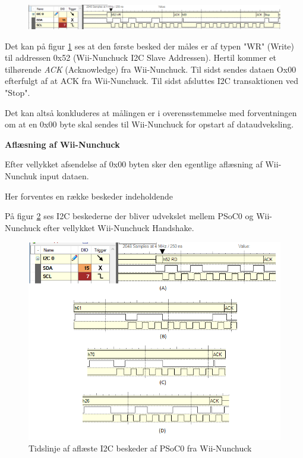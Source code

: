 \begin{figure}[H]
	\centering
	\includegraphics[width=\textwidth]{Test/images/writerequest}
	\caption{}
	\label{fig:NunchuckWriteValues}
\end{figure}

Det kan på figur \ref{fig:NunchuckWriteValues} ses at den første besked der måles er af typen "WR" (Write) til addressen 0x52 (Wii-Nunchuck I2C Slave Addressen). Hertil kommer et tilhørende \textit{ACK} (Acknowledge) fra Wii-Nunchuck. Til sidst sendes dataen Ox00 efterfulgt af at ACK fra Wii-Nunchuck. Til sidst afsluttes I2C transaktionen ved "Stop".

Det kan altså konkluderes at målingen er i overensstemmelse med forventningen om at en 0x00 byte skal sendes til Wii-Nunchuck for opstart af dataudveksling.

\textbf{Aflæsning af Wii-Nunchuck}

Efter vellykket afsendelse af 0x00 byten sker den egentlige aflæsning af Wii-Nunchuk input dataen.

Her forventes en række beskeder indeholdende 

På figur \ref{fig:NunchuckReadValues} ses I2C beskederne der bliver udvekslet mellem PSoC0 og Wii-Nunchuck efter vellykket Wii-Nunchuck Handshake. 

\begin{figure}[H]
	\centering
	\includegraphics[width=\textwidth]{Test/images/readvaluesEdited.png}
	\caption{Tidslinje af aflæste I2C beskeder af PSoC0 fra Wii-Nunchuck}
	\label{fig:NunchuckReadValues}
\end{figure}

